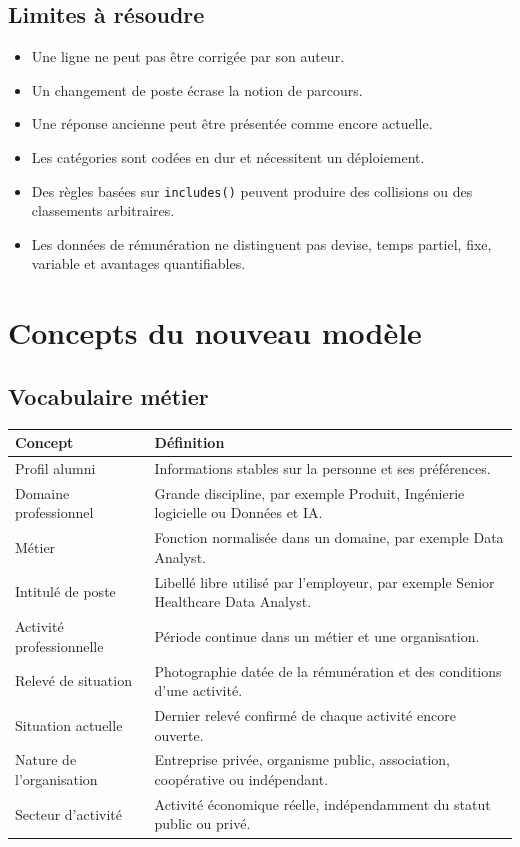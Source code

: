 \documentclass[11pt,a4paper]{article}
\begin{document}
\subsection{Limites à résoudre}

\begin{itemize}
  \item Une ligne ne peut pas être corrigée par son auteur.
  \item Un changement de poste écrase la notion de parcours.
  \item Une réponse ancienne peut être présentée comme encore actuelle.
  \item Les catégories sont codées en dur et nécessitent un déploiement.
  \item Des règles basées sur \texttt{includes()} peuvent produire des
        collisions ou des classements arbitraires.
  \item Les données de rémunération ne distinguent pas devise, temps partiel,
        fixe, variable et avantages quantifiables.
\end{itemize}

\section{Concepts du nouveau modèle}

\subsection{Vocabulaire métier}

\begin{tabularx}{\textwidth}{@{}L{43mm}Y@{}}
  \toprule
  \textbf{Concept} & \textbf{Définition} \\
  \midrule
  Profil alumni & Informations stables sur la personne et ses préférences. \\
  Domaine professionnel & Grande discipline, par exemple Produit, Ingénierie logicielle ou Données et IA. \\
  Métier & Fonction normalisée dans un domaine, par exemple Data Analyst. \\
  Intitulé de poste & Libellé libre utilisé par l'employeur, par exemple Senior Healthcare Data Analyst. \\
  Activité professionnelle & Période continue dans un métier et une organisation. \\
  Relevé de situation & Photographie datée de la rémunération et des conditions d'une activité. \\
  Situation actuelle & Dernier relevé confirmé de chaque activité encore ouverte. \\
  Nature de l'organisation & Entreprise privée, organisme public, association, coopérative ou indépendant. \\
  Secteur d'activité & Activité économique réelle, indépendamment du statut public ou privé. \\
  \bottomrule
\end{tabularx}
\end{document}
